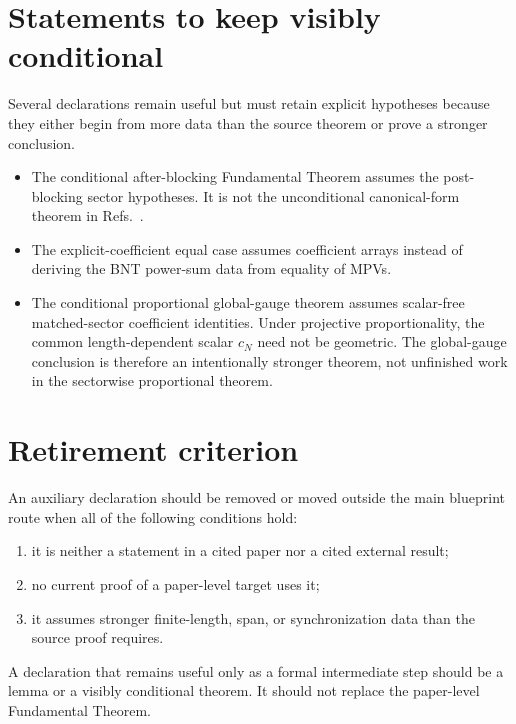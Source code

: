 \documentclass{article}
\begin{document}
\section{Statements to keep visibly conditional}

Several declarations remain useful but must retain explicit hypotheses because
they either begin from more data than the source theorem or prove a stronger
conclusion.
\begin{itemize}
    \item The conditional after-blocking Fundamental Theorem assumes the
          post-blocking sector hypotheses. It is not the unconditional
          canonical-form theorem in
          Refs.~\cite{Cirac2016MPDO_arXiv,Cirac2021Matrix}.
    \item The explicit-coefficient equal case assumes coefficient arrays
          instead of deriving the BNT power-sum data from equality of MPVs.
    \item The conditional proportional global-gauge theorem assumes
          scalar-free matched-sector coefficient identities. Under projective
          proportionality, the common length-dependent scalar $c_N$ need not
          be geometric. The global-gauge conclusion is therefore an
          intentionally stronger theorem, not unfinished work in the
          sectorwise proportional theorem.
\end{itemize}

\section{Retirement criterion}

An auxiliary declaration should be removed or moved outside the main blueprint
route when all of the following conditions hold:
\begin{enumerate}
    \item it is neither a statement in a cited paper nor a cited external
          result;
    \item no current proof of a paper-level target uses it;
    \item it assumes stronger finite-length, span, or synchronization data than
          the source proof requires.
\end{enumerate}
A declaration that remains useful only as a formal intermediate step should be
a lemma or a visibly conditional theorem. It should not replace the
paper-level Fundamental Theorem.



\end{document}
